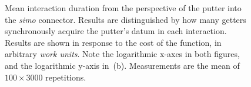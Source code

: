\begin{figure}
	\centering
	\caption[Interaction duration with parallel getters.]{Mean interaction duration from the perspective of the putter into the \textit{simo} connector. Results are distinguished by how many getters synchronously acquire the putter's datum in each interaction. Results are shown in response to the cost of the  function, in arbitrary \textit{work units}. Note the logarithmic x-axes in both figures, and the logarithmic y-axis in~(b). Measurements are the mean of $100\times{}3000$ repetitions.}
	\label{fig:simo}
\end{figure}



